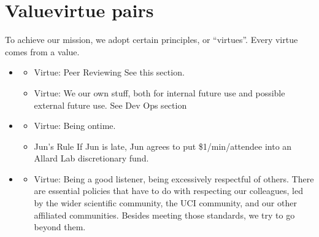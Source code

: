 \documentclass[letterpaper,10pt,english]{sphinxmanual}
\begin{document}
\section{Value\sphinxhyphen{}virtue pairs}
\label{\detokenize{01OurMission:value-virtue-pairs}}
\sphinxAtStartPar
To achieve our mission, we adopt certain principles, or “virtues”. Every virtue comes from a value.
\begin{itemize}
\item {} \begin{description}
\begin{itemize}
\item {} 
\sphinxAtStartPar
Virtue: Peer Reviewing See this {\hyperref[\detokenize{PeerReviewing:peer-reviewing}]{}} section.

\item {} 
\sphinxAtStartPar
Virtue: We  our own stuff, both for internal future use and possible external future use. See Dev Ops section

\end{itemize}

\end{description}

\item {} \begin{description}
\begin{itemize}
\item {} 
\sphinxAtStartPar
Virtue: Being on\sphinxhyphen{}time.

\item {} 
\sphinxAtStartPar
Jun’s Rule If Jun is late, Jun agrees to put \$1/min/attendee into an Allard Lab discretionary fund.

\end{itemize}

\end{description}

\item {} \begin{description}
\begin{itemize}
\item {} 
\sphinxAtStartPar
Virtue: Being a good listener, being excessively respectful of others. There are essential policies that have to do with respecting our colleagues, led by the wider scientific community, the UCI community, and our other affiliated communities. Besides meeting those standards, we try to go beyond them.


\end{itemize}
\end{description}
\end{itemize}
\end{document}
